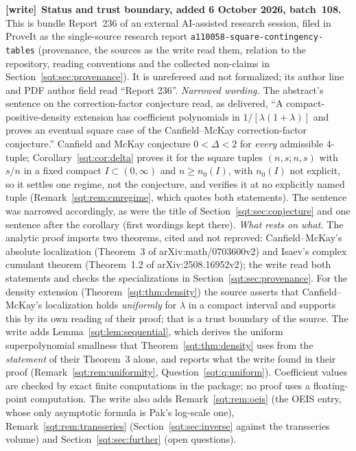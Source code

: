 \documentclass[11pt,letterpaper]{article}
\theoremstyle{definition}\newtheorem{definition}[theorem]{Definition}
\theoremstyle{remark}\newtheorem{remark}[theorem]{Remark}
\newcommand{\file}[1]{\nolinkurl{#1}}
\newenvironment{writenote}[1][]{\par\smallskip\begingroup\small
 \noindent\textbf{[write]}\if\relax\detokenize{#1}\relax\else~\textbf{#1.}\fi\ }%
 {\par\endgroup\smallskip}
\begin{document}
\begin{writenote}[Status and trust boundary, added 6 October 2026, batch~108]
This is bundle Report~236 of an external AI-assisted research session, filed
in ProveIt as the single-source research report
\file{a110058-square-contingency-tables} (provenance, the sources as the
write read them, relation to the repository, reading conventions and the
collected non-claims in Section~\ref{sqt:sec:provenance}). It is unrefereed
and not formalized; its author line and PDF author field read ``Report 236''.
\emph{Narrowed wording.} The abstract's sentence on the correction-factor
conjecture read, as delivered, ``A compact-positive-density extension has
coefficient polynomials in $1/[\lambda(1+\lambda)]$ and proves an eventual
square case of the Canfield--McKay correction-factor conjecture.'' Canfield
and McKay conjecture $0<\Delta<2$ for \emph{every} admissible 4-tuple;
Corollary~\ref{sqt:cor:delta} proves it for the square tuples
$(n,s;n,s)$ with $s/n$ in a fixed compact $I\subset(0,\infty)$ and
$n\ge n_0(I)$, with $n_0(I)$ not explicit, so it settles one regime, not the
conjecture, and verifies it at no explicitly named tuple
(Remark~\ref{sqt:rem:cmregime}, which quotes both statements). The
sentence was narrowed accordingly, as were the title of
Section~\ref{sqt:sec:conjecture} and one sentence after the corollary (first
wordings kept there). \emph{What rests on what.} The analytic proof imports
two theorems, cited and not reproved: Canfield--McKay's absolute
localization (Theorem~3 of arXiv:math/0703600v2) and Isaev's complex
cumulant theorem (Theorem~1.2 of arXiv:2508.16952v2); the write read both
statements and checks the specializations in
Section~\ref{sqt:sec:provenance}. For the density extension
(Theorem~\ref{sqt:thm:density}) the source asserts that Canfield--McKay's
localization holds \emph{uniformly} for $\lambda$ in a compact interval and
supports this by its own reading of their proof; that is a trust boundary of
the source. The write adds Lemma~\ref{sqt:lem:sequential}, which derives the
uniform superpolynomial smallness that Theorem~\ref{sqt:thm:density} uses
from the \emph{statement} of their Theorem~3 alone, and reports what the
write found in their proof (Remark~\ref{sqt:rem:uniformity},
Question~\ref{sqt:q:uniform}). Coefficient values are checked by exact finite
computations in the package; no proof uses a floating-point computation. The
write also adds Remark~\ref{sqt:rem:oeis} (the OEIS entry, whose only
asymptotic formula is Pak's log-scale one),
Remark~\ref{sqt:rem:transseries} (Section~\ref{sqt:sec:inverse} against the
transseries volume) and Section~\ref{sqt:sec:further} (open questions).
\end{writenote}
\setcounter{tocdepth}{1}
\begingroup
\small\setlength{\parskip}{0pt}
\makeatletter
\renewcommand\l@section[2]{\@dottedtocline{1}{0em}{2em}{#1}{#2}}
\makeatother
\tableofcontents
\endgroup
\clearpage












\end{document}
